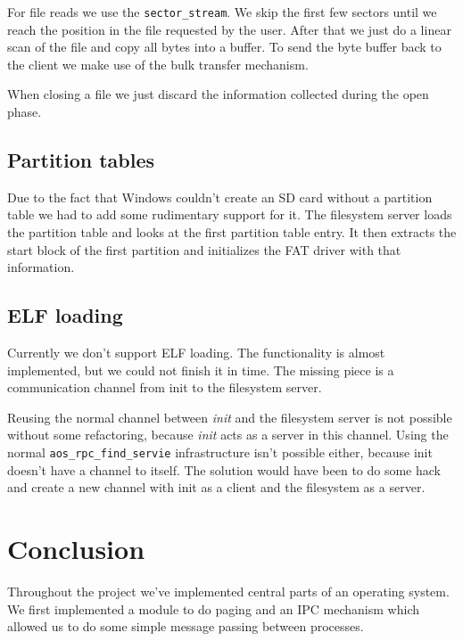 \documentclass[a4paper,10pt]{article}
\begin{document}
For file reads we use the \lstinline!sector_stream!.
We skip the first few sectors until we reach the position in the file requested by the user.
After that we just do a linear scan of the file and copy all bytes into a buffer.
To send the byte buffer back to the client we make use of the bulk transfer mechanism.

When closing a file we just discard the information collected during the open phase.

\subsection{Partition tables}
Due to the fact that Windows couldn't create an SD card without a partition table we had to add some rudimentary support for it.
The filesystem server loads the partition table and looks at the first partition table entry.
It then extracts the start block of the first partition and initializes the FAT driver with that information.

\subsection{ ELF loading}

Currently we don't support ELF loading.
The functionality is almost implemented, but we could not finish it in time.
The missing piece is a communication channel from init to the filesystem server.

Reusing the normal channel between \emph{init} and the filesystem server is not possible without some refactoring, because \emph{init} acts as a server in this channel.
Using the normal \lstinline!aos_rpc_find_servie! infrastructure isn't possible either, because init doesn't have a channel to itself.
The solution would have been to do some hack and create a new channel with init as a client and the filesystem as a server.


\section{Conclusion}
Throughout the project we've implemented central parts of an operating system.
We first implemented a module to do paging and an IPC mechanism which allowed us to do some simple message passing between processes.
\end{document}
